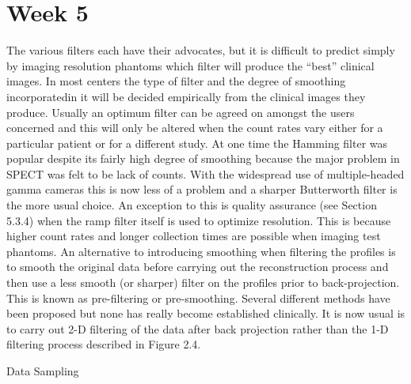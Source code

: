 \documentclass[12pt]{article}
\begin{document}
\section*{Week 5}

The various filters each have their advocates, but it is difficult to predict simply by imaging resolution phantoms which filter will produce the “best” clinical images. In most centers the type of filter and the degree of smoothing incorporatedin it will be decided empirically from the clinical images they produce. Usually an optimum filter can be agreed on amongst the users concerned and this will only be altered when the count rates vary either for a particular patient or for a different study. At one time the Hamming filter was popular despite its fairly high degree of smoothing because the major problem in SPECT was felt to be lack of counts. With the widespread use of multiple-headed gamma cameras this is now less of a problem and a sharper Butterworth filter is the more usual choice. An exception to this is quality assurance (see Section 5.3.4) when the ramp filter itself is used to optimize resolution. This is because higher count rates and longer collection times are possible when imaging test phantoms.
An alternative to introducing smoothing when filtering the profiles is to smooth the original data before carrying out the reconstruction process and
then use a less smooth (or sharper) filter on the profiles prior to back-projection. This is known as pre-filtering or pre-smoothing. Several different methods have been proposed but none has really become established clinically. It is now usual is to carry out 2-D filtering of the data after back projection rather than the 1-D filtering process described in Figure 2.4.

 Data Sampling
 
\end{document}
